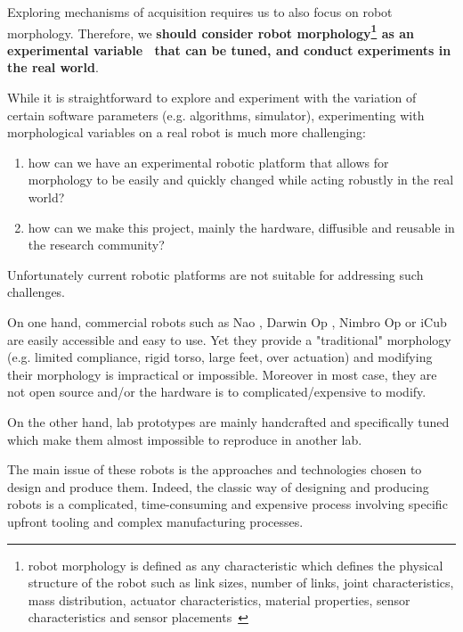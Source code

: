 
Exploring mechanisms of acquisition requires us to also focus on robot morphology. Therefore, we \textbf{should consider robot morphology\footnote{ robot morphology is defined as any characteristic which defines the physical structure of the robot such as link sizes, number of links, joint characteristics, mass distribution, actuator characteristics, material properties, sensor characteristics and sensor placements~\parencite{paul2006morphological}} as an experimental variable~\parencite{kaplan2008corps} that can be tuned, and conduct experiments in the real world}.

While it is straightforward to explore and experiment with the variation of certain software parameters (e.g. algorithms, simulator), experimenting with morphological variables on a real robot is much more challenging:

\begin{enumerate}
    \item how can we have an experimental robotic platform that allows for morphology to be easily and quickly changed  while acting robustly in the real world?
    \item how can we make this project, mainly the hardware, diffusible and reusable in the research community?
\end{enumerate}

Unfortunately current robotic platforms are not suitable for addressing such challenges.

On one hand, commercial robots such as Nao \parencite{gouaillier2008nao}, Darwin Op \parencite{ha2011development}, Nimbro Op \parencite{schwarznimbro} or iCub \parencite{metta2008icub} are easily accessible and easy to use. Yet they provide a "traditional" morphology (e.g. limited compliance, rigid torso, large feet, over actuation) and modifying their morphology is impractical or impossible. Moreover in most case, they are not open source and/or the hardware is to complicated/expensive to modify.

On the other hand, lab prototypes are mainly handcrafted and specifically tuned which make them almost impossible to reproduce in another lab.

The main issue of these robots is the approaches and technologies chosen to design and produce them. Indeed, the classic way of designing and producing robots is a complicated, time-consuming and expensive process involving specific upfront tooling and complex manufacturing processes.

